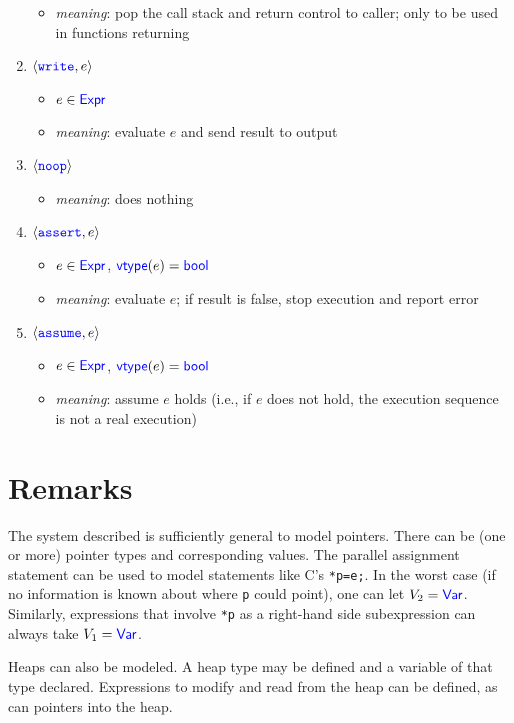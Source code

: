 \documentclass[11pt, oneside, letterpaper]{book}
\begin{document}
\begin{enumerate}
  \begin{itemize}
  \item \emph{meaning}: pop the call stack and return control to caller;
    only to be used in functions returning 
  \end{itemize}
\item $\langle\texttt{\textcolor{blue}{write}},e\rangle$
  \begin{itemize}
  \item $e\in\textsf{\textcolor{blue}{\textup{Expr}}}$
  \item \emph{meaning}: evaluate $e$ and send result to output
  \end{itemize}
\item $\langle\texttt{\textcolor{blue}{noop}}\rangle$
  \begin{itemize}
  \item \emph{meaning}: does nothing
  \end{itemize}
\item $\langle\texttt{\textcolor{blue}{assert}}, e\rangle$
  \begin{itemize}
  \item $e\in\textsf{\textcolor{blue}{\textup{Expr}}}$, $\textsf{\textcolor{blue}{\textup{vtype}}}(e)=\textsf{\textcolor{blue}{\textup{bool}}}$
  \item \emph{meaning}: evaluate $e$; if result is false, stop
    execution and report error
  \end{itemize}
\item  $\langle\texttt{\textcolor{blue}{assume}}, e\rangle$
  \begin{itemize}
  \item $e\in\textsf{\textcolor{blue}{\textup{Expr}}}$, $\textsf{\textcolor{blue}{\textup{vtype}}}(e)=\textsf{\textcolor{blue}{\textup{bool}}}$
  \item \emph{meaning}: assume $e$ holds (i.e., if $e$ does not hold,
    the execution sequence is not a real execution)
  \end{itemize}
\end{enumerate}

\section{Remarks}

The system described is sufficiently general to model pointers. There
can be (one or more) pointer types and corresponding values.  The
parallel assignment statement can be used to model statements like
C's \texttt{*p=e;}.  In the worst case (if no information is known
about where \texttt{p} could point), one can let $V_2=\textsf{\textcolor{blue}{\textup{Var}}}$.
Similarly, expressions that involve \texttt{*p} as a right-hand
side subexpression can always take $V_1=\textsf{\textcolor{blue}{\textup{Var}}}$.

Heaps can also be modeled.  A heap type may be defined and a variable
of that type declared.  Expressions to modify and read from the heap
can be defined, as can pointers into the heap.
\end{document}
